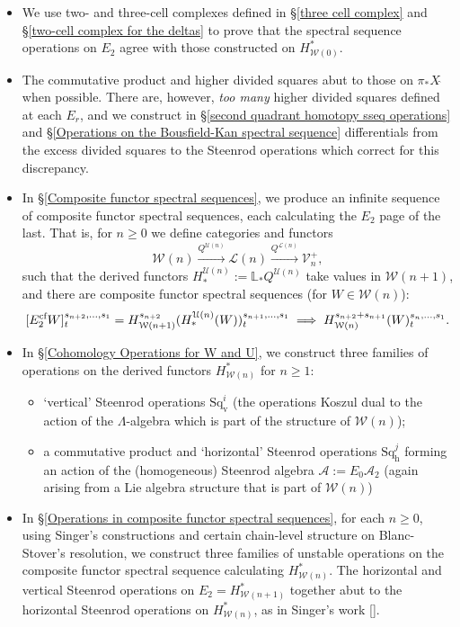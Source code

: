 \documentclass[11pt]{amsart} \renewcommand{\baselinestretch}{1.4}
\theoremstyle{plain}
\theoremstyle{definition}
\renewcommand{\to}{\longrightarrow}
\newcommand{\calA}{\mathcal{A}}
\newcommand{\calV}{\mathcal{V}}
\newcommand{\calw}{\mathcal{W}}
\newcommand{\calu}{\mathcal{U}}
\newcommand{\cala}{\mathcal{A}}
\newcommand{\call}{\mathcal{L}}
\newcommand{\vect}[2]{\calV^{#1}_{#2}}
\newcommand{\LieSteen}{\calA}
\newcommand{\E}[5]{[E^{#1}_{#2}#3]^{#4}_{#5}}
\newcommand{\dver}{_\mathrm{v}}
\newcommand{\dhor}{_\mathrm{h}}
\newcommand{\Sqh}{\mathrm{Sq}\dhor}
\newcommand{\Sqv}{\mathrm{Sq}\dver}
\begin{document}
\begin{Introduction}
\begin{itemize}
\item We use two- and three-cell complexes defined in \S\ref{three cell complex} and \S\ref{two-cell complex for the deltas} to prove that the spectral sequence operations  on $E_2$ agree with those constructed on $H^*_{\calw(0)}$.
\item The commutative product and higher divided squares abut to those on $\pi_*X\hat{\ }$ when possible. There are, however, \emph{too many} higher divided squares  defined at each $E_r$, and we construct in \S\ref{second quadrant homotopy sseq operations} and \S\ref{Operations on the Bousfield-Kan spectral sequence} differentials from the excess divided squares to the Steenrod operations which correct for this discrepancy.
\item  In \S\ref{Composite functor spectral sequences}, we produce an infinite sequence of composite functor spectral sequences, each calculating the $E_2$ page of the last. That is, for $n\geq0$ we define categories and functors 
\[\calw(n)\overset{Q^{\calu(n)}}{\to}\call(n)\overset{Q^{\call(n)}}{\to}\vect{+}{n},\]
such that the derived functors $H_*^{\calu(n)}:=\mathbb{L}_*Q^{\calu(n)}$ take values in $\calw(n+1)$, and there are composite functor spectral sequences (for $W\in\calw(n)$):
\[\E{\textup{cf}}{2}{W}{s_{n+2},\ldots,s_1}{t}=H^{s_{n+2}}_{\calw(n+1)}(H_*^{\calu(n)}(W))^{s_{n+1},\ldots,s_1}_t\implies H^{s_{n+2}+s_{n+1}}_{\calw(n)} (W)_t^{s_n,\ldots,s_1}.\]
\item In \S\ref{Cohomology Operations for W and U}, we construct three families of operations on the derived functors $H^*_{\calw(n)}$ for $n\geq1$:
\begin{itemize}
\item `vertical' Steenrod operations  $\Sqv^i$ (the operations Koszul dual to the action of the $\Lambda$-algebra which is part of the structure of $\calw(n)$);
\item a commutative product and `horizontal' Steenrod operations $\Sqh^j$ forming an action of the (homogeneous) Steenrod algebra $\LieSteen:=E_0\cala_2$ (again arising from a Lie algebra structure that is part of $\calw(n)$)
\end{itemize}
\item In \S\ref{Operations in composite functor spectral sequences}, for each $n\geq0$, using Singer's constructions and certain  chain-level structure on Blanc-Stover's resolution,  we construct three families of unstable operations on the composite functor spectral sequence calculating $H^*_{\calw(n)}$.  The horizontal and vertical Steenrod operations on $E_2=H^*_{\calw(n+1)}$ together abut to the horizontal Steenrod operations on $H^*_{\calw(n)}$, as in Singer's work [].

\end{itemize}
\end{Introduction}
\end{document}

